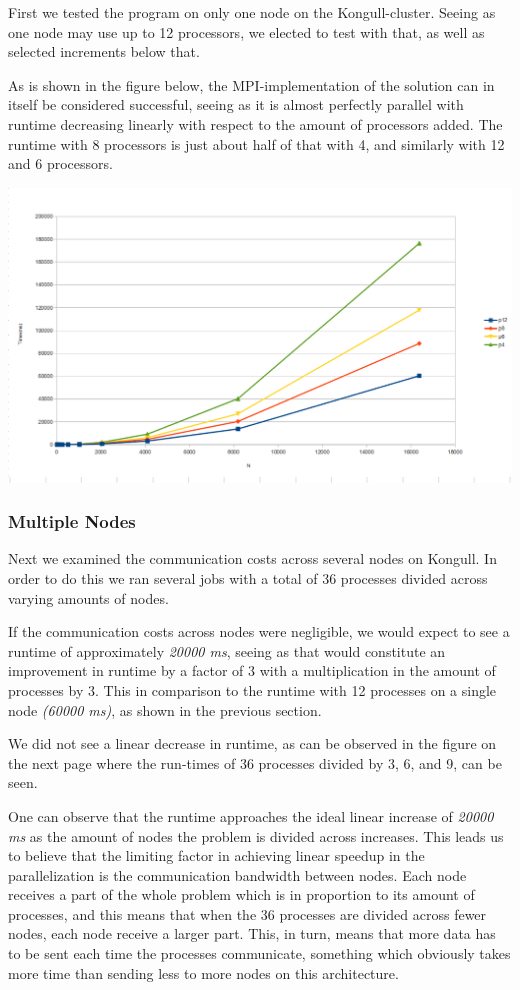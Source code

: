 \documentclass[fontsize=11pt,paper=a4,titlepage]{article}
\begin{document}
First we tested the program on only one node on the Kongull-cluster. Seeing as
one node may use up to 12 processors, we elected to test with that, as well as
selected increments below that.

As is shown in the figure below, the MPI-implementation of the
solution can in itself be considered successful, seeing as it is almost
perfectly parallel with runtime decreasing linearly with respect to the amount
of processors added. The runtime with 8 processors is just about half of that
with 4, and similarly with 12 and 6 processors.

\hspace*{-1.7cm}\includegraphics[scale=0.6]{pics/pX.png}

\subsubsection{Multiple Nodes}

Next we examined the communication costs across several nodes on Kongull. In
order to do this we ran several jobs with a total of 36 processes divided across
varying amounts of nodes.

If the communication costs across nodes were negligible, we would expect to see
a runtime of approximately \emph{20000 ms}, seeing as that would constitute an
improvement in runtime by a factor of 3 with a multiplication in the amount of
processes by 3. This in comparison to the runtime with 12 processes on a single
node \emph{(60000 ms)}, as shown in the previous section.

We did not see a linear decrease in runtime, as can be observed in the figure
on the next page where the run-times of 36 processes divided by 3, 6, and 9, can
be seen.

One can observe that the runtime approaches the ideal linear increase of
\emph{20000 ms} as the amount of nodes the problem is divided across increases.
This leads us to believe that the limiting factor in achieving linear speedup in
the parallelization is the communication bandwidth between nodes. Each node
receives a part of the whole problem which is in proportion to its amount of
processes, and this means that when the 36 processes are divided across fewer
nodes, each node receive a larger part. This, in turn, means that more data has
to be sent each time the processes communicate, something which obviously takes
more time than sending less to more nodes on this architecture.
\end{document}

